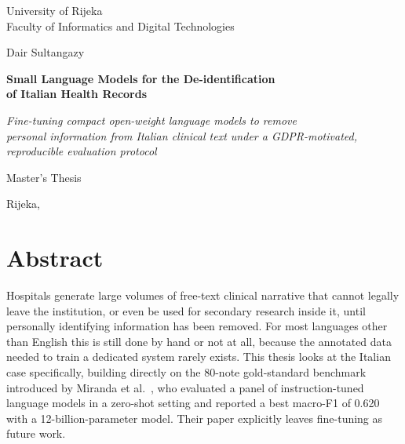 \documentclass[12pt,a4paper]{report}
\begin{document}
\begin{titlepage}
\begin{center}

\vspace*{0.5cm}
{\large University of Rijeka}\\[0.2cm]
{\large Faculty of Informatics and Digital Technologies}

\vspace{2.2cm}
{\large Dair Sultangazy}

\vspace{2.2cm}
{\Large\bfseries Small Language Models for the De-identification\\[0.2cm] of Italian Health Records}

\vspace{0.6cm}
{\large\itshape Fine-tuning compact open-weight language models to remove\\ personal information from Italian clinical text under a GDPR-motivated,\\ reproducible evaluation protocol}

\vspace{1.8cm}
{\large Master's Thesis}

\vfill

{\large Rijeka, \the\year}

\end{center}
\end{titlepage}


\chapter*{Abstract}

Hospitals generate large volumes of free-text clinical narrative that cannot legally leave the institution, or even be used for secondary research inside it, until personally identifying information has been removed. For most languages other than English this is still done by hand or not at all, because the annotated data needed to train a dedicated system rarely exists. This thesis looks at the Italian case specifically, building directly on the 80-note gold-standard benchmark introduced by Miranda et al.~\cite{miranda2025mamma}, who evaluated a panel of instruction-tuned language models in a zero-shot setting and reported a best macro-F1 of 0.620 with a 12-billion-parameter model. Their paper explicitly leaves fine-tuning as future work.
\end{document}

